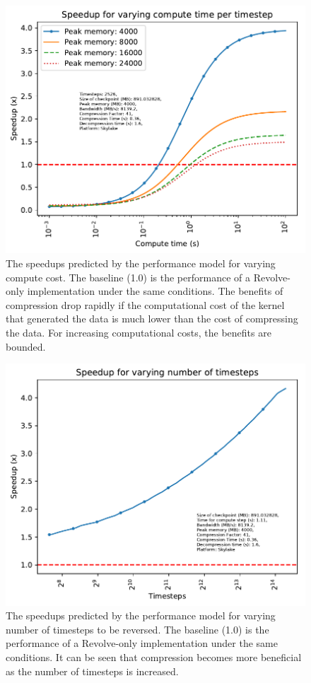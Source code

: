 \documentclass[conference]{IEEEtran}
\begin{document}
\begin{figure}
\begin{center}
\includegraphics[width=0.9\linewidth]{images/varying-compute.pdf}
\end{center}
\caption{The speedups predicted by the performance model for varying
  compute cost. The baseline
(1.0) is the performance of a Revolve-only implementation under the
same conditions. The benefits of compression drop rapidly if the
computational cost of the kernel that generated the data is much lower
than the cost of compressing the data. For increasing computational
costs, the benefits are bounded.}
\label{fig:varying_compute}
\end{figure}

\begin{figure}
\begin{center}
\includegraphics[width=0.9\linewidth]{images/varying-nt.pdf}
\end{center}
\caption{The speedups predicted by the performance model for varying
  number of timesteps to be reversed. The baseline
(1.0) is the performance of a Revolve-only implementation under the
same conditions. It can be seen that compression becomes more
beneficial as the number of timesteps is increased.}
\label{fig:varying_nt}
\end{figure}
\end{document}
